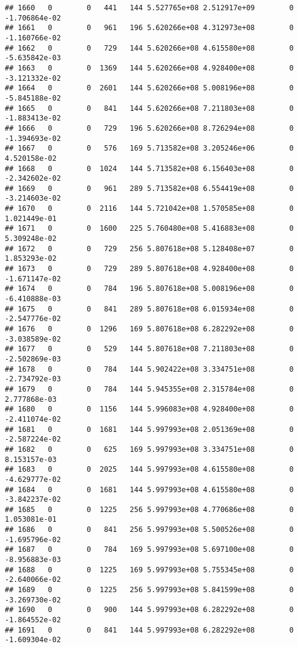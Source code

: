 \documentclass[
]{article}
\begin{document}
\begin{enumerate}
\begin{verbatim}
## 1660   0        0   441   144 5.527765e+08 2.512917e+09        0 -1.706864e-02
## 1661   0        0   961   196 5.620266e+08 4.312973e+08        0 -1.160766e-02
## 1662   0        0   729   144 5.620266e+08 4.615580e+08        0 -5.635842e-03
## 1663   0        0  1369   144 5.620266e+08 4.928400e+08        0 -3.121332e-02
## 1664   0        0  2601   144 5.620266e+08 5.008196e+08        0 -5.845188e-02
## 1665   0        0   841   144 5.620266e+08 7.211803e+08        0 -1.883413e-02
## 1666   0        0   729   196 5.620266e+08 8.726294e+08        0 -1.394693e-02
## 1667   0        0   576   169 5.713582e+08 3.205246e+06        0  4.520158e-02
## 1668   0        0  1024   144 5.713582e+08 6.156403e+08        0 -2.342602e-02
## 1669   0        0   961   289 5.713582e+08 6.554419e+08        0 -3.214603e-02
## 1670   0        0  2116   144 5.721042e+08 1.570585e+08        0  1.021449e-01
## 1671   0        0  1600   225 5.760480e+08 5.416883e+08        0  5.309248e-02
## 1672   0        0   729   256 5.807618e+08 5.128408e+07        0  1.853293e-02
## 1673   0        0   729   289 5.807618e+08 4.928400e+08        0 -1.671147e-02
## 1674   0        0   784   196 5.807618e+08 5.008196e+08        0 -6.410888e-03
## 1675   0        0   841   289 5.807618e+08 6.015934e+08        0 -2.547776e-02
## 1676   0        0  1296   169 5.807618e+08 6.282292e+08        0 -3.038589e-02
## 1677   0        0   529   144 5.807618e+08 7.211803e+08        0 -2.502869e-03
## 1678   0        0   784   144 5.902422e+08 3.334751e+08        0 -2.734792e-03
## 1679   0        0   784   144 5.945355e+08 2.315784e+08        0  2.777868e-03
## 1680   0        0  1156   144 5.996083e+08 4.928400e+08        0 -2.411074e-02
## 1681   0        0  1681   144 5.997993e+08 2.051369e+08        0 -2.587224e-02
## 1682   0        0   625   169 5.997993e+08 3.334751e+08        0  8.153157e-03
## 1683   0        0  2025   144 5.997993e+08 4.615580e+08        0 -4.629777e-02
## 1684   0        0  1681   144 5.997993e+08 4.615580e+08        0 -3.842237e-02
## 1685   0        0  1225   256 5.997993e+08 4.770686e+08        0  1.053081e-01
## 1686   0        0   841   256 5.997993e+08 5.500526e+08        0 -1.695796e-02
## 1687   0        0   784   169 5.997993e+08 5.697100e+08        0 -8.956883e-03
## 1688   0        0  1225   169 5.997993e+08 5.755345e+08        0 -2.640066e-02
## 1689   0        0  1225   256 5.997993e+08 5.841599e+08        0 -3.269730e-02
## 1690   0        0   900   144 5.997993e+08 6.282292e+08        0 -1.864552e-02
## 1691   0        0   841   144 5.997993e+08 6.282292e+08        0 -1.609304e-02

\end{verbatim}
\end{enumerate}
\end{document}
